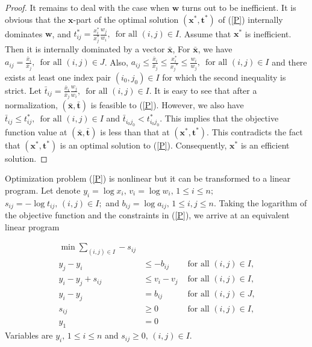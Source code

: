 \documentclass{article}
\theoremstyle{plain}
\begin{document}
\begin{proof}
It remains to deal with the case when $\mathbf{w}$ turns out to be inef{\kern0pt}f{\kern0pt}icient. It is obvious that the $\mathbf{x}$-part of the optimal solution $(\mathbf{x}^{\ast},\mathbf{t}^{\ast})$ of (\ref{P}) internally dominates $\mathbf{w}$, and $t_{{i}{j}}^{\ast}= \frac{x_{i}^{\ast}}{x_{j}^{\ast}} \frac{w_{j}}{w_{i}},\,\text{ for all } (i,j)\in I$. Assume that $\mathbf{x}^{\ast}$ is inef{\kern0pt}f{\kern0pt}icient. Then it is internally dominated by a vector $\mathbf{\bar x}$, For $\mathbf{\bar x}$, we have $a_{ij}=\frac{\bar x_i}{\bar x_j},\,\text{ for all } (i,j)\in J$. Also,
$a_{ij}\le\frac{\bar x_i}{\bar x_j}\le\frac{x_i^{\ast}}{{x_j}^{\ast}}\le\frac{ w_i}{w_j},\,\text{ for all } (i,j)\in I$ and there exists at least one index pair
$(i_0, j_0)\in I$
for which the second inequality is strict.   Let
$\bar t_{{i}{j}}= \frac{\bar x_{i}}{\bar x_{j}} \frac{w_{j}}{w_{i}},\,\text{ for all } (i,j)\in I$.
It is easy to see that after a normalization, $(\mathbf{\bar x},\mathbf{\bar t})$ is feasible to (\ref{P}). However, we also have $\bar t_{{i}{j}}\le t_{{i}{j}}^{\ast}, \,\text{ for all } (i,j)\in I$ and
$\bar t_{{i_0}{j_0}} < t_{{i_0}{j_0}}^{\ast}$. This implies that the objective function value at $(\mathbf{\bar x},\mathbf{\bar t})$ is less than that at $(\mathbf{x}^{\ast},\mathbf{t}^{\ast})$. This contradicts the fact that
$(\mathbf{x}^{\ast},\mathbf{t}^{\ast})$ is an optimal solution to (\ref{P}). Consequently, $\mathbf{x}^{\ast}$ is an ef{\kern0pt}f{\kern0pt}icient solution.

\end{proof}

Optimization problem (\ref{P}) is nonlinear but it can be transformed to a linear program.
Let denote
$y_i = \log x_i,  \, v_i = \log w_i, \, 1 \leq i \leq n;$
$s_{ij} = - \log t_{ij}, \, (i,j) \in I;$ and
$b_{ij} = \log a_{ij}, \, 1 \leq i,j \leq n.$
Taking the logarithm of the objective function and the constraints in (\ref{P}), we arrive at an equivalent linear program

\begin{align}
\min  \sum\limits_{(i,j)\in I } - s_{ij}
     &  &  \nonumber  \\
y_j - y_i  & \leq - b_{ij}    &\text{ for all $(i,j) \in I$,} \nonumber  \\
y_i - y_j + s_{ij} & \leq  v_i - v_j  &\text{ for all $(i,j) \in I$,} \label{LP} \\ %
y_i - y_j  & = b_{ij}    &\text{ for all $(i,j) \in J$,} \nonumber \\
s_{ij}  & \geq 0  &\text{ for all $(i,j) \in I$,} \nonumber \\
                   y_1 & = 0    & \nonumber
\end{align}
Variables are $y_i, \,  1 \leq i \leq n$ and $s_{ij} \geq 0, \, (i,j) \in I.$ \\
\end{document}
